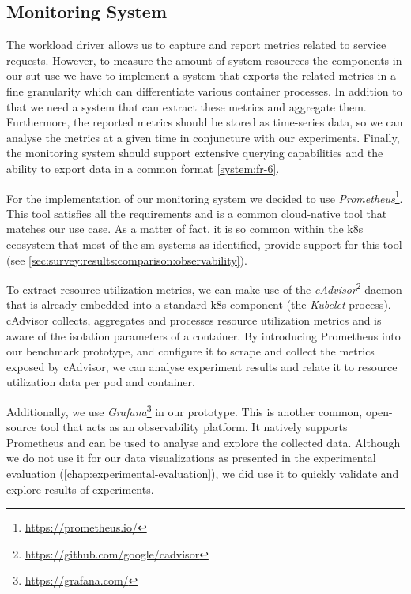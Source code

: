 \subsection{Monitoring System}
\label{sec:system:monitoring-system}

The workload driver allows us to capture and report metrics related to service requests. However, to measure the amount of system resources the components in our \gls{sut} use we have to implement a system that exports the related metrics in a fine granularity which can differentiate various container processes. In addition to that we need a system that can extract these metrics and aggregate them. Furthermore, the reported metrics should be stored as time-series data, so we can analyse the metrics at a given time in conjuncture with our experiments. Finally, the monitoring system should support extensive querying capabilities and the ability to export data in a common format \ref{system:fr-6}.

For the implementation of our monitoring system we decided to use \textit{Prometheus}\footnote{\url{https://prometheus.io/}}. This tool satisfies all the requirements and is a common cloud-native tool that matches our use case. As a matter of fact, it is so common within the \gls{k8s} ecosystem that most of the \gls{sm} systems as identified, provide support for this tool (see \cref{sec:survey:results:comparison:observability}).

To extract resource utilization metrics, we can make use of the \textit{cAdvisor}\footnote{\url{https://github.com/google/cadvisor}} daemon that is already embedded into a standard \gls{k8s} component (the \textit{Kubelet} process). cAdvisor collects, aggregates and processes resource utilization metrics and is aware of the isolation parameters of a container. By introducing Prometheus into our benchmark prototype, and configure it to scrape and collect the metrics exposed by cAdvisor, we can analyse experiment results and relate it to resource utilization data per pod and container.

Additionally, we use \textit{Grafana}\footnote{\url{https://grafana.com/}} in our prototype. This is another common, open-source tool that acts as an observability platform. It natively supports Prometheus and can be used to analyse and explore the collected data. Although we do not use it for our data visualizations as presented in the experimental evaluation (\cref{chap:experimental-evaluation}), we did use it to quickly validate and explore results of experiments.



